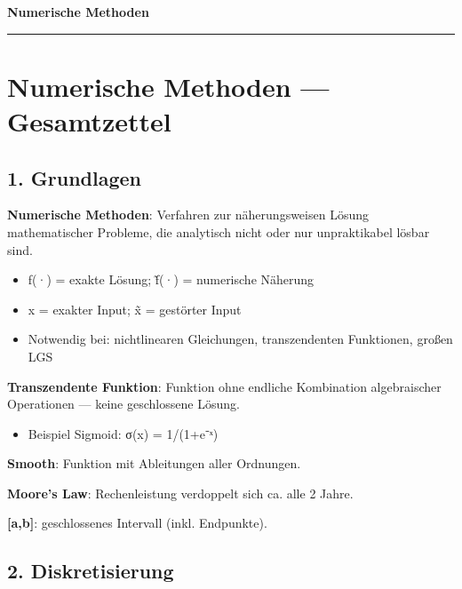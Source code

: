 \documentclass[11pt, a4paper]{article}
\providecommand{\nichttitle}{Lernzettel}
\renewcommand{\nichttitle}{Numerische Methoden}
\begin{document}
\begin{center}
{\bfseries\Large\color{accent}\nichttitle}\\[2pt]
\color{accent}\rule{0.35\linewidth}{1pt}\color{black}
\end{center}
\vspace{2pt}

{\small\tableofcontents}
\newpage


\section{Numerische Methoden — Gesamtzettel}


\subsection{1. Grundlagen}

\textbf{Numerische Methoden}: Verfahren zur näherungsweisen Lösung mathematischer Probleme, die analytisch nicht oder nur unpraktikabel lösbar sind.

\begin{itemize}
  \item f(·) = exakte Lösung; f̃(·) = numerische Näherung
  \item x = exakter Input; x̃ = gestörter Input
  \item Notwendig bei: nichtlinearen Gleichungen, transzendenten Funktionen, großen LGS
\end{itemize}

\textbf{Transzendente Funktion}: Funktion ohne endliche Kombination algebraischer Operationen — keine geschlossene Lösung.

\begin{itemize}
  \item Beispiel Sigmoid: σ(x) = 1/(1+e⁻ˣ)
\end{itemize}

\textbf{Smooth}: Funktion mit Ableitungen aller Ordnungen.


\textbf{Moore's Law}: Rechenleistung verdoppelt sich ca. alle 2 Jahre.


\textbf{[a,b]}: geschlossenes Intervall (inkl. Endpunkte).



\subsection{2. Diskretisierung}
\end{document}
